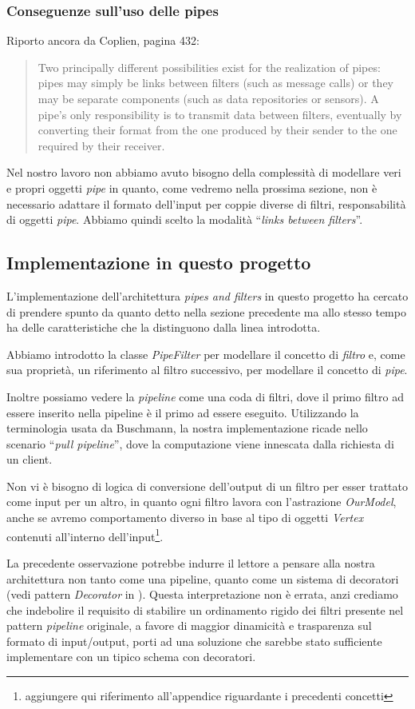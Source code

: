 \subsubsection{Conseguenze sull'uso delle pipes}
Riporto ancora da Coplien, pagina 432:
\begin{quotation}
  Two principally different possibilities exist for the realization of
  pipes: pipes may simply be links between filters (such as message
  calls) or they may be separate components (such as data repositories
  or sensors). A pipe's only responsibility is to transmit data
  between filters, eventually by converting their format from the one
  produced by their sender to the one required by their receiver.
\end{quotation}
Nel nostro lavoro non abbiamo avuto bisogno della complessit\`a di
modellare veri e propri oggetti \emph{pipe} in quanto, come vedremo
nella prossima sezione, non \`e necessario adattare il formato
dell'input per coppie diverse di filtri, responsabilit\`a di oggetti
\emph{pipe}. Abbiamo quindi scelto la modalit\`a ``\emph{links between
  filters}''.

\subsection{Implementazione in questo progetto}
L'implementazione dell'architettura \emph{pipes and filters} in questo
progetto ha cercato di prendere spunto da quanto detto nella sezione
precedente ma allo stesso tempo ha delle caratteristiche che la
distinguono dalla linea introdotta.

Abbiamo introdotto la classe \emph{PipeFilter} per modellare il
concetto di \emph{filtro} e, come sua propriet\`a, un riferimento al
filtro successivo, per modellare il concetto di \emph{pipe}.

Inoltre possiamo vedere la \emph{pipeline} come una coda di filtri,
dove il primo filtro ad essere inserito nella pipeline \`e il primo ad
essere eseguito. Utilizzando la terminologia usata da Buschmann, la
nostra implementazione ricade nello scenario ``\emph{pull pipeline}'',
dove la computazione viene innescata dalla richiesta di un client.

Non vi \`e bisogno di logica di conversione dell'output di un filtro
per esser trattato come input per un altro, in quanto ogni filtro
lavora con l'astrazione \emph{OurModel}, anche se avremo comportamento
diverso in base al tipo di oggetti \emph{Vertex} contenuti all'interno
dell'input\footnote{aggiungere qui riferimento all'appendice
  riguardante i precedenti concetti}.

La precedente osservazione potrebbe indurre il lettore a pensare alla
nostra architettura non tanto come una pipeline, quanto come un
sistema di decoratori (vedi pattern \emph{Decorator} in
\cite{SmalltalkCompanion98}). Questa interpretazione non \`e errata,
anzi crediamo che indebolire il requisito di stabilire un ordinamento
rigido dei filtri presente nel pattern \emph{pipeline} originale, a
favore di maggior dinamicit\`a e trasparenza sul formato di
input/output, porti ad una soluzione che sarebbe stato sufficiente
implementare con un tipico schema con decoratori.
